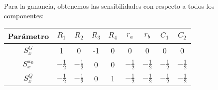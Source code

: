 \documentclass[../tc_tpfinal_main.tex]{subfiles}
\begin{document}
Para la ganancia, obtenemos las sensibilidades con respecto a todos los componentes:\par

\begin{table}[H] %
	\centering
 	\begin{tabular}{||c c c c c c c c c||} 
 		\hline
	  	Parámetro& $R_1$ & $R_2$ & $R_3$ & $R_4$ & $r_a$ & $r_b$&$C_1$&$C_2$\\ [0.5ex] 
 		\hline\hline
		$S^G_x$& 1 & 0& -1& 0&0&0&0&0\\
		$S^{w_0}_x$& $- \frac{1}{2}$ &$- \frac{1}{2}$& 0& 0&$- \frac{1}{2}$&$- \frac{1}{2}$&$- \frac{1}{2}$&$- \frac{1}{2}$\\
		$S^{Q}_x$&$- \frac{1}{2}$ &$- \frac{1}{2}$& 0& 1&$- \frac{1}{2}$&$- \frac{1}{2}$&$- \frac{1}{2}$&$- \frac{1}{2}$\\[1ex] 
		\hline
	\end{tabular}
\end{table}
			
\end{document}
